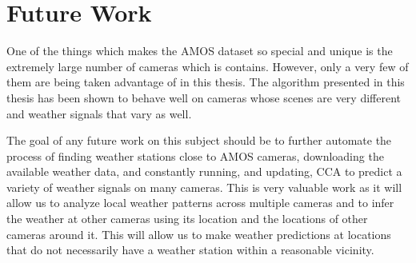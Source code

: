 \section{Future Work}
One of the things which makes the AMOS dataset so special and unique is the extremely large number of cameras which is contains. However, only a very few of them are being taken advantage of in this thesis. The algorithm presented in this thesis has been shown to behave well on cameras whose scenes are very different and weather signals that vary as well.

The goal of any future work on this subject should be to further automate the process of finding weather stations close to AMOS cameras, downloading the available weather data, and constantly running, and updating, CCA to predict a variety of weather signals on many cameras. This is very valuable work as it will allow us to analyze local weather patterns across multiple cameras and to infer the weather at other cameras using its location and the locations of other cameras around it. This will allow us to make weather predictions at locations that do not necessarily have a weather station within a reasonable vicinity. 